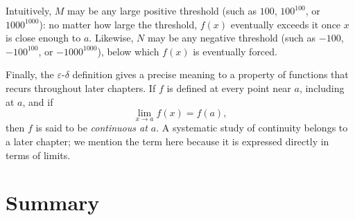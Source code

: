 Intuitively, \(M\) may be any large positive threshold (such as \(100\), \(100^{100}\), or \(1000^{1000}\)): no matter how large the threshold, \(f(x)\) eventually exceeds it once \(x\) is close enough to \(a\). Likewise, \(N\) may be any negative threshold (such as \(-100\), \(-100^{100}\), or \(-1000^{1000}\)), below which \(f(x)\) is eventually forced.

Finally, the \(\varepsilon\)-\(\delta\) definition gives a precise meaning to a property of functions that recurs throughout later chapters. If \(f\) is defined at every point near \(a\), including at \(a\), and if
\[
\lim_{x \to a} f(x) = f(a),
\]
then \(f\) is said to be \emph{continuous at \(a\)}. A systematic study of continuity belongs to a later chapter; we mention the term here because it is expressed directly in terms of limits.


\section*{Summary}

